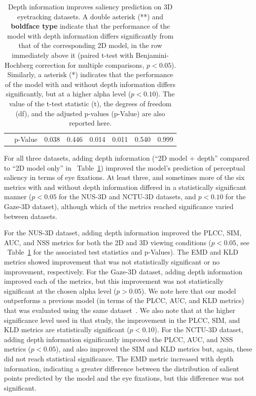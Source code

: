 \begin{table}[t!]
{\begin{tabular}{|c|p{3 cm}|c|c|c|c|c|c|}
  & p-Value & 0.038 & 0.446 & 0.014 & 0.011 & 0.540 & 0.999 \\\cline{1-8}
\end{tabular}}
\makeatletter
\let\@currsize\normalsize
\caption[Summary table of model performance on different eyetracking datasets]{Depth information improves saliency prediction on 3D eyetracking datasets. A double asterisk (**) and {\bf boldface type} indicate that the performance of the model with depth information differs significantly from that of the corresponding 2D model, in the row immediately above it (paired t-test with Benjamini-Hochberg correction for multiple comparisons, $p < 0.05$). Similarly, a asterisk (*) indicates that the performance of the model with and without depth information differs significantly, but at a higher alpha level ($p < 0.10$). The value of the t-test statistic (t), the degrees of freedom (df), and the adjusted p-values (p-Value) are also reported here.}
\label{table:main_result}
\end{table}


For all three datasets, adding depth information (``2D model + depth'' compared to ``2D model only'' in ~Table~\ref{table:main_result}) improved the model's prediction of perceptual saliency in terms of eye fixations. At least three, and sometimes more of the six metrics with and without depth information differed in a statistically significant manner ($p < 0.05$ for the NUS-3D and NCTU-3D datasets, and $p < 0.10$ for the Gaze-3D dataset), although which of the metrics reached significance varied between datasets.

For the NUS-3D dataset, adding depth information improved the PLCC, SIM, AUC, and NSS metrics for both the 2D and 3D viewing conditions ($p < 0.05$, see ~Table~\ref{table:main_result} for the associated test statistics and p-Values). The EMD and KLD metrics showed improvement that was not statistically significant or no improvement, respectively. For the Gaze-3D dataset, adding depth information improved each of the metrics, but this improvement was not statistically significant at the chosen alpha level ($p > 0.05$). We note here that our model outperforms a previous model (in terms of the PLCC, AUC, and KLD metrics) that was evaluated using the same dataset~\citep{Wang_etal13}. We also note that at the higher significance level used in that study, the improvement in the PLCC, SIM, and KLD metrics are statistically significant ($p < 0.10$). For the NCTU-3D dataset, adding depth information significantly improved the PLCC, AUC, and NSS metrics ($p < 0.05$), and also improved the SIM and KLD metrics but, again, these did not reach statistical significance. The EMD metric increased with depth information, indicating a greater difference between the distribution of salient points predicted by the model and the eye fixations, but this difference was not significant.

